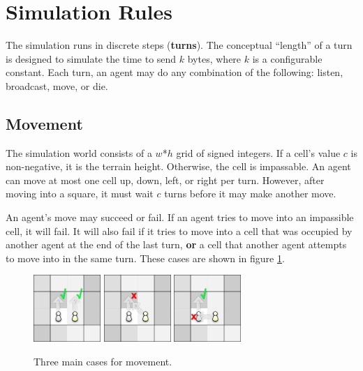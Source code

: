 \section{Simulation Rules} \label{rules}

The simulation runs in discrete steps (\textbf{turns}). The conceptual ``length'' of a turn is
designed to simulate the time to send $k$ bytes, where $k$ is a configurable constant. Each turn, an agent may do any combination of the following: listen, broadcast, move, or die.

\subsection{Movement}

The simulation world consists of a $w$*$h$ grid of signed integers. If a cell's value $c$ is
non-negative, it is the terrain height. Otherwise, the cell is impassable. An agent can move at most
one cell up, down, left, or right per turn. However, after moving into a square, it must wait $c$
turns before it may make another move.

An agent's move may succeed or fail. If an agent tries to move into an impassible cell, it will
fail. It will also fail if it tries to move into a cell that was occupied by another agent at the
end of the last turn, \textbf{or} a cell that another agent attempts to move into in the same turn.
These cases are shown in figure \ref{mvt}.

\begin{figure}[h!]
    \begin{center}
        \includegraphics[width=1in]{figures/mvt1.png}
        \includegraphics[width=1in]{figures/mvt2.png}
        \includegraphics[width=1in]{figures/mvt3.png}
    \end{center}
    \caption{Three main cases for movement.}
    \label{mvt}
\end{figure}

